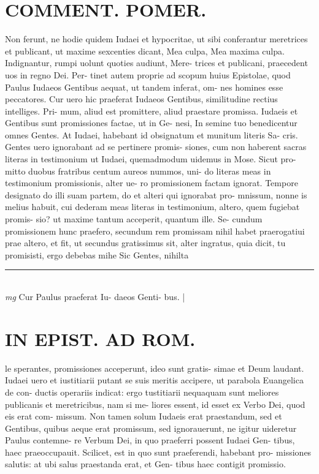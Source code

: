 \documentclass{article}
\begin{document}
\begin{pages}
\section*{COMMENT. POMER.  }\pstart Non ferunt, ne hodie quidem Iudaei et hypocritae, ut sibi conferantur meretrices et publicant, ut maxime sexcenties dicant, Mea culpa, Mea maxima culpa.  Indignantur, rumpi uolunt quoties audiunt, Mere- trices et publicani, praecedent uos in regno Dei. Per- tinet autem proprie ad scopum huius Epistolae, quod Paulus Iudaeos Gentibus aequat, ut tandem inferat, om- nes homines esse peccatores. Cur uero hic praeferat Iudaeos Gentibus, similitudine rectius intelliges. Pri- mum, aliud est promittere, aliud praestare promissa.  Iudaeis et Gentibus sunt promissiones factae, ut in Ge- nesi, In semine tuo benedicentur omnes Gentes. At Iudaei, habebant id obsignatum et munitum literis Sa- cris. Gentes uero ignorabant ad se pertinere promis- siones, cum non haberent sacras literas in testimonium ut Iudaei, quemadmodum uidemus in Mose. Sicut pro- mitto duobus fratribus centum aureos nummos, uni- do literas meas in testimonium promissionis, alter ue- ro promissionem factam ignorat. Tempore designato do illi suam partem, do et alteri qui ignorabat pro- mnissum, nonne is melius habuit, cui dederam meas literas in testimonium, altero, quem fugiebat promis- sio? ut maxime tantum acceperit, quantum ille. Se- cundum promissionem hunc praefero, secundum rem promissam nihil habet praerogatiui prae altero, et fit, ut secundus gratissimus sit, alter ingratus, quia dicit, tu promisisti, ergo debebas mihe Sic Gentes, nihilta  \pend
\vspace{0.5cm}\noindent
\vspace{0.2cm}\rule{1cm}{0.2pt}\\ 
\hspace{0.2cm}\textit{mg}
\footnotesize Cur Paulus praeferat Iu- daeos Genti- bus.  
\normalsize| 
\section*{IN EPIST. AD ROM.  }
\marginpar{[ p.25 ]}\pstart le sperantes, promissiones acceperunt, ideo sunt gratis- simae et Deum laudant. Iudaei uero et iustitiarii putant se suis meritis accipere, ut parabola Euangelica de con- ductis operariis indicat: ergo tustitiarii nequaquam sunt meliores publicanis et meretricibus, nam si me- liores essent, id esset ex Verbo Dei, quod eis erat com- missum. Non tamen solum Iudaeis erat praestandum, sed et Gentibus, quibus aeque erat promissum, sed ignorauerunt, ne igitur uideretur Paulus contemne- re Verbum Dei, in quo praeferri possent Iudaei Gen- tibus, haec praeoccupauit.   \pend\pstart Scilicet, est in quo sunt praeferendi, habebant pro- missiones salutis: at ubi salus praestanda erat, et Gen- tibus haec contigit promissio.  \pend
{}
{}

\end{pages}
\end{document}

